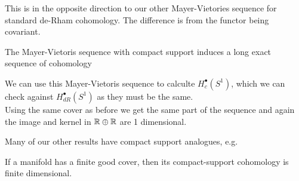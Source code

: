 \documentclass{article}
\begin{document}
\begin{remark}
	This is in the opposite direction to our other Mayer-Vietories sequence for standard de-Rham cohomology. The difference is from the functor being covariant. 
\end{remark}

\begin{prop}
	The Mayer-Vietoris sequence with compact support induces a long exact sequence of cohomology
	\begin{center}
	\end{center}
\end{prop}

\begin{example}
	We can use this Mayer-Vietoris sequence to calculte $H_c^\bullet(S^1)$, which we can check against $H^\bullet_{dR}(S^1)$ as they must be the same. \\
	Using the same cover as before we get the same part of the sequence 
and again the image and kernel in $\mathbb{R} \oplus \mathbb{R}$ are 1 dimensional. 
\end{example}

Many of our other results have compact support analogues, e.g. 
\begin{prop}
	If a manifold has a finite good cover, then its compact-support cohomology is finite dimensional. 
\end{prop}
\end{document}
